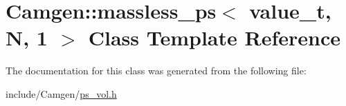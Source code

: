 \hypertarget{a00353}{\section{Camgen\-:\-:massless\-\_\-ps$<$ value\-\_\-t, N, 1 $>$ Class Template Reference}
\label{a00353}
}


The documentation for this class was generated from the following file\-:\begin{DoxyCompactItemize}
\item 
include/\-Camgen/\hyperlink{a00719}{ps\-\_\-vol.\-h}\end{DoxyCompactItemize}
